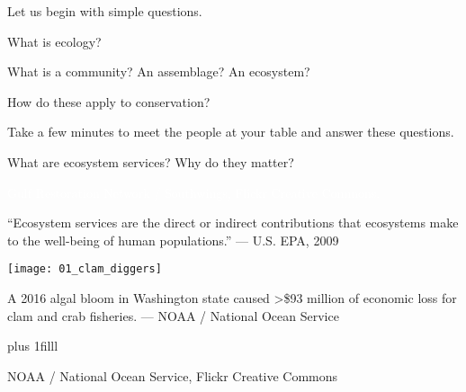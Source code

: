 \documentclass[t]{beamer}
\begin{document}
{
\begin{frame}
\end{frame}
}

{
\begin{frame}
\end{frame}
}

{
\begin{frame}
\end{frame}
}

\begin{frame}[t]{Let us begin with simple questions.}

	\hangpara What is ecology?
	
	\hangpara What is a community? An assemblage? An ecosystem?

	\hangpara How do these apply to conservation?

	\hangpara Take a few minutes to meet the people at your table and answer these questions.

\end{frame}

{
\begin{frame}[b]{What are ecosystem services? Why do they matter?}
	
\tiny\hfill\textcolor{white}{Gulf Restoration Network / Southwings, Flickr Creative Commons.}

\end{frame}
}


\begin{frame}[t]
	
	“Ecosystem services are the direct or indirect contributions that ecosystems make to the well-being of human populations.” — U.S. EPA, 2009 \vspace*{\baselineskip}
	
	\texttt{[image: 01\_clam\_diggers]}
	
	A 2016 algal bloom in Washington state caused \textgreater \$93 million of economic loss for clam and crab fisheries. --- NOAA / National Ocean Service
	
	\vskip0pt plus 1filll
	
	\hfill\tiny NOAA / National Ocean Service, Flickr Creative Commons
	
\end{frame}
\end{document}

